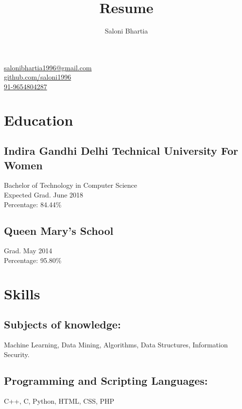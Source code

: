 \documentclass[]{hieudo-build}
\author{Saloni Bhartia}
\title{Resume}
\begin{document}
{
	\faEnvelope \href{mailto:salonibhartia1996@gmail.com}{ salonibhartia1996@gmail.com}\\
	\faGithub \href{https://github.com/saloni1996}{ github.com/saloni1996}\\
	\faPhone  \href{}{91-9654804287}
}
\begin{minipage}[t]{0.3\textwidth} 

\section{Education} 

\subsection[Indira Gandhi Delhi Technical University For Women]{Indira Gandhi Delhi Technical University For Women}
Bachelor of Technology in Computer Science \\
Expected Grad. June 2018 \\
Percentage: 84.44\% \\
\sectionsep

\subsection{Queen Mary's School}
Grad. May 2014  
\\ Percentage: 95.80\%
\sectionsep

\section{Skills}
\subsection[Subjects]{Subjects of knowledge:}
Machine Learning, Data Mining, Algorithms, Data Structures, Information Security.

\subsection[Languages]{Programming and Scripting Languages:}
C++, C, Python, HTML, CSS, PHP\\ 


\end{minipage}
\end{document}
